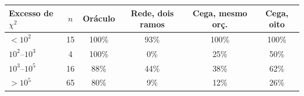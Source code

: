 \begin{tabular}{lccccc}
	\toprule
	Excesso de $\chi^2$ & $n$ & Oráculo & Rede, dois ramos & Cega, mesmo orç. & Cega, oito \\
	\midrule
	$< 10^2$ & 15 & 100\% & 93\% & 100\% & 100\% \\
	$10^2$--$10^3$ & 4 & 100\% & 0\% & 25\% & 50\% \\
	$10^3$--$10^5$ & 16 & 88\% & 44\% & 38\% & 62\% \\
	$> 10^5$ & 65 & 80\% & 9\% & 12\% & 26\% \\
	\bottomrule
\end{tabular}
